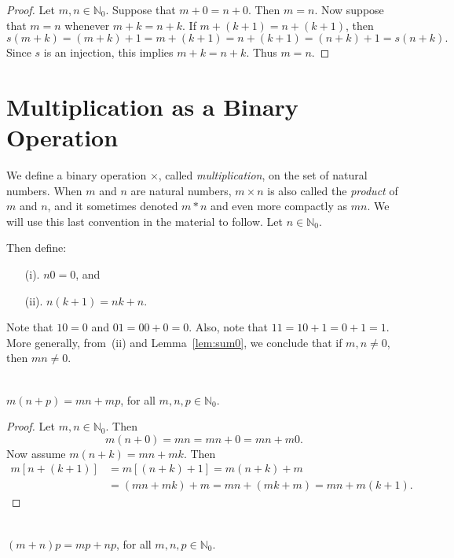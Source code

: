 \begin{proof}
Let $m,n\in \mathbb{N}_0$.  Suppose that $m+0=n+0$.  Then $m=n$.
Now suppose that $m=n$ whenever $m+k=n+k$.
If $m+(k+1)=n+(k+1)$, then 
\[
s(m+k)=(m+k)+1=m+(k+1)=n+(k+1)=(n+k)+1=s(n+k).
\]
Since $s$ is an
injection, this implies $m+k=n+k$.  Thus $m=n$.
\end{proof}

\section{Multiplication as a Binary Operation}\label{s:mult}

We define a binary operation $\times$, called \textit{multiplication}, 
on the set of natural numbers.  When $m$ and $n$ are natural
numbers, $m\times n$ is also called the \textit{product}
of $m$ and $n$, and it sometimes denoted 
$m*n$ and even more compactly as $mn$.  We will use this
last convention in the material to follow. Let $n\in \mathbb{N}_0$. 

Then define:

\begin{enumerate}
\item[(i).] $n0=0$, and
\item[(ii).] $n(k+1)=nk +n$.
\end{enumerate}

Note that $10=0$ and $01=00+0=0$.  Also, note that $11=10+1=0+1=1$.
More generally, from~(ii) and Lemma~\ref{lem:sum0}, we 
conclude that if $m,n\neq0$, then $mn\neq0$.

\begin{theorem}{}\\
$m(n+p)=mn + mp$, for all $m,n,p\in \mathbb{N}_0$.
\end{theorem}

\begin{proof}
Let $m,n\in \mathbb{N}_0$.  Then 
\[
m(n+0)=mn = mn +0 = mn+ m0.
\]
Now assume $m(n+k) = mn + mk$.
Then
\begin{align*}
m[n+(k+1)] &= m[(n+k)+1]=m(n+k)+m\\
&=(mn+mk)+m=mn+(mk+m)= mn+m(k+1).
\end{align*}
\end{proof}

\begin{theorem}{}\\
$(m+n)p=mp + np$, for all $m,n,p\in \mathbb{N}_0$.
\end{theorem}

